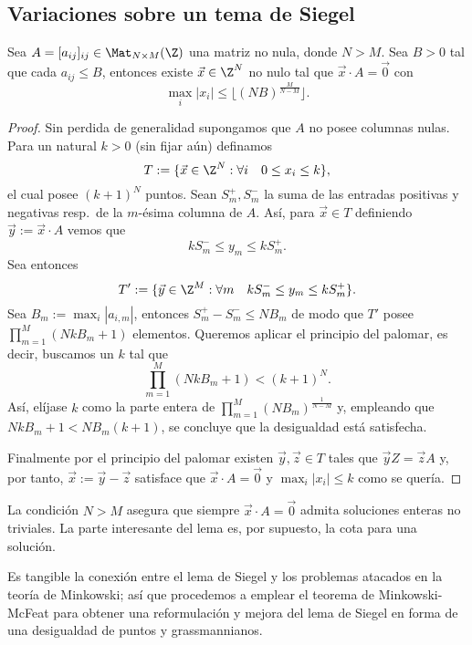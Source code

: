 \documentclass[teoria-numeros.tex]{subfiles}
\begin{document}
\subsection{Variaciones sobre un tema de Siegel}
\begin{lem}[Siegel, 1929]
	Sea $A = [a_{ij}]_{ij} \in \Mat_{N\times M}(\Z)$ una matriz no nula, donde $N > M$.
	Sea $B > 0$ tal que cada $a_{ij} \le B$, entonces existe $\vec x \in \Z^N$ no nulo tal que $\vec x \cdot A = \Vec 0$ con
	$$ \max_i |x_i| \le \lfloor (NB)^{ \frac{M}{N - M} } \rfloor. $$
\end{lem}
\begin{proof}
	Sin perdida de generalidad supongamos que $A$ no posee columnas nulas.
	Para un natural $k > 0$ (sin fijar aún) definamos
	$$ T := \{ \vec x \in \Z^N : \forall i \quad 0 \le x_i \le k \}, $$
	el cual posee $(k+1)^N$ puntos.
	Sean $S_m^+, S_m^-$ la suma de las entradas positivas y negativas resp.\ de la $m$-ésima columna de $A$.
	Así, para $\vec x \in T$ definiendo $\vec y := \vec x\cdot A$ vemos que
	$$ kS_m^- \le y_m \le kS_m^+. $$
	Sea entonces
	$$ T' := \{ \vec y \in \Z^M : \forall m \quad kS_m^- \le y_m \le kS_m^+ \}. $$
	Sea $B_m := \max_i |a_{i,m}|$, entonces $S_m^+ - S_m^- \le NB_m$ de modo que $T'$ posee $\prod_{m=1}^{M} (NkB_m + 1)$ elementos.
	Queremos aplicar el principio del palomar, es decir, buscamos un $k$ tal que
	$$ \prod_{m=1}^{M} (NkB_m + 1) < (k + 1)^N. $$
	Así, elíjase $k$ como la parte entera de $\prod_{m=1}^{M} (NB_m)^{\frac{1}{N - M}}$ y, empleando que $NkB_m + 1 < NB_m(k + 1)$,
	se concluye que la desigualdad está satisfecha.

	Finalmente por el principio del palomar existen $\vec y, \vec z \in T$ tales que $\vec y Z = \vec z A$ y, por tanto, $\vec x := \vec y - \vec z$
	satisface que $\vec x\cdot A = \Vec 0$ y $\max_i |x_i| \le k$ como se quería.
\end{proof}
La condición $N > M$ asegura que siempre $\vec x \cdot A = \Vec 0$ admita soluciones enteras no triviales.
La parte interesante del lema es, por supuesto, la cota para una solución.

Es tangible la conexión entre el lema de Siegel y los problemas atacados en la teoría de Minkowski;
así que procedemos a emplear el teorema de Minkowski-McFeat para obtener una reformulación y mejora del lema de Siegel
en forma de una desigualdad de puntos y grassmannianos.
\end{document}

